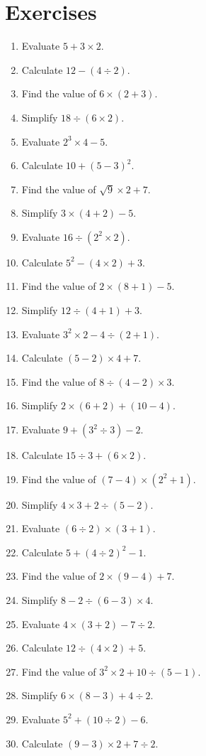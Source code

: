 \documentclass[12pt]{article}
\begin{document}
\section*{Exercises}
\begin{multicols}{2}
\begin{enumerate}
    \item Evaluate $5 + 3 \times 2$.
    \item Calculate $12 - (4 \div 2)$.
    \item Find the value of $6 \times (2 + 3)$.
    \item Simplify $18 \div (6 \times 2)$.
    \item Evaluate $2^3 \times 4 - 5$.
    \item Calculate $10 + (5 - 3)^2$.
    \item Find the value of $\sqrt{9} \times 2 + 7$.
    \item Simplify $3 \times (4 + 2) - 5$.
    \item Evaluate $16 \div (2^2 \times 2)$.
    \item Calculate $5^2 - (4 \times 2) + 3$.
    \item Find the value of $2 \times (8 + 1) - 5$.
    \item Simplify $12 \div (4 + 1) + 3$.
    \item Evaluate $3^2 \times 2 - 4 \div (2 + 1)$.
    \item Calculate $(5 - 2) \times 4 + 7$.
    \item Find the value of $8 \div (4 - 2) \times 3$.
    \item Simplify $2 \times (6 + 2) + (10 - 4)$.
    \item Evaluate $9 + (3^2 \div 3) - 2$.
    \item Calculate $15 \div 3 + (6 \times 2)$.
    \item Find the value of $(7 - 4) \times (2^2 + 1)$.
    \item Simplify $4 \times 3 + 2 \div (5 - 2)$.
    \item Evaluate $(6 \div 2) \times (3 + 1)$.
    \item Calculate $5 + (4 \div 2)^2 - 1$.
    \item Find the value of $2 \times (9 - 4) + 7$.
    \item Simplify $8 - 2 \div (6 - 3) \times 4$.
    \item Evaluate $4 \times (3 + 2) - 7 \div 2$.
    \item Calculate $12 \div (4 \times 2) + 5$.
    \item Find the value of $3^2 \times 2 + 10 \div (5 - 1)$.
    \item Simplify $6 \times (8 - 3) + 4 \div 2$.
    \item Evaluate $5^2 + (10 \div 2) - 6$.
    \item Calculate $(9 - 3) \times 2 + 7 \div 2$.
\end{enumerate}
\end{multicols}
\end{document}
